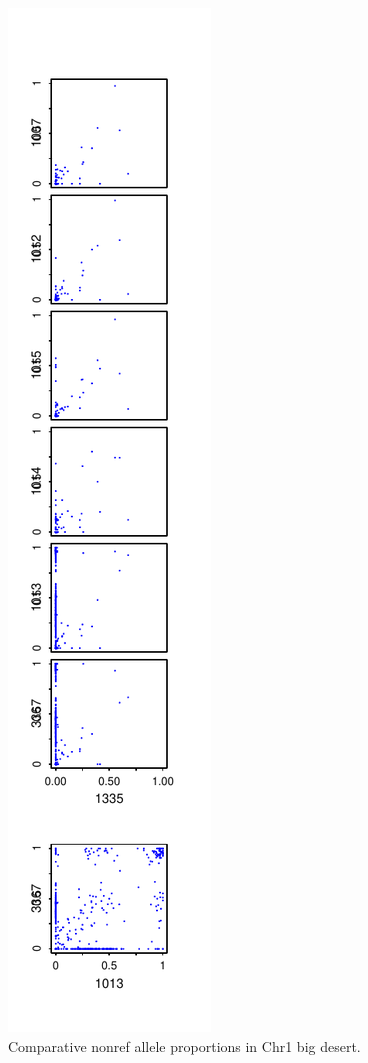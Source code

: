 \documentclass{article}\usepackage[]{graphicx}\usepackage[]{color}
\makeatletter
\def\maxwidth{ %
  \ifdim\Gin@nat@width>\linewidth
    \linewidth
  \else
    \Gin@nat@width
  \fi
}
\newenvironment{knitrout}{}{} %
\makeatother
\begin{document}
\begin{knitrout}
\begin{figure}
\includegraphics[width=\maxwidth]{Fig1-mscat-figs/6plus1-for-big-desert-1} \caption[Comparative nonref allele proportions in Chr1 big desert]{Comparative nonref allele proportions in Chr1 big desert.}\label{fig:6plus1-for-big-desert}
\end{figure}


\end{knitrout}
\end{document}
